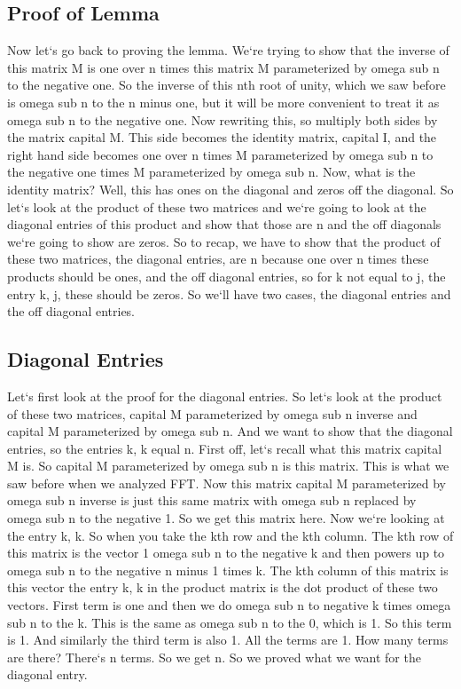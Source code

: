 \subsection{Proof of Lemma}
Now let`s go back to proving the lemma.
We`re trying to show that the inverse of this matrix M is one over n times this matrix M parameterized by omega sub n to the negative one.
So the inverse of this nth root of unity, which we saw before is omega sub n to the n minus one, but it will be more convenient to treat it as omega sub n to the negative one.
Now rewriting this, so multiply both sides by the matrix capital M\@.
This side becomes the identity matrix, capital I, and the right hand side becomes one over n times M parameterized by omega sub n to the negative one times M parameterized by omega sub n.
Now, what is the identity matrix? Well, this has ones on the diagonal and zeros off the diagonal.
So let`s look at the product of these two matrices and we`re going to look at the diagonal entries of this product and show that those are n and the off diagonals we`re going to show are zeros.
So to recap, we have to show that the product of these two matrices, the diagonal entries, are n because one over n times these products should be ones, and the off diagonal entries, so for k not equal to j, the entry k, j, these should be zeros.
So we`ll have two cases, the diagonal entries and the off diagonal entries.

\subsection{Diagonal Entries}
Let`s first look at the proof for the diagonal entries.
So let`s look at the product of these two matrices, capital M parameterized by omega sub n inverse and capital M parameterized by omega sub n.
And we want to show that the diagonal entries, so the entries k, k equal n.
First off, let`s recall what this matrix capital M is.
So capital M parameterized by omega sub n is this matrix.
This is what we saw before when we analyzed FFT\@.
Now this matrix capital M parameterized by omega sub n inverse is just this same matrix with omega sub n replaced by omega sub n to the negative 1.
So we get this matrix here.
Now we`re looking at the entry k, k.
So when you take the kth row and the kth column.
The kth row of this matrix is the vector 1 omega sub n to the negative k and then powers up to omega sub n to the negative n minus 1 times k.
The kth column of this matrix is this vector the entry k, k in the product matrix is the dot product of these two vectors.
First term is one and then we do omega sub n to negative k times omega sub n to the k.
This is the same as omega sub n to the 0, which is 1.
So this term is 1.
And similarly the third term is also 1.
All the terms are 1.
How many terms are there? There`s n terms.
So we get n.
So we proved what we want for the diagonal entry.

